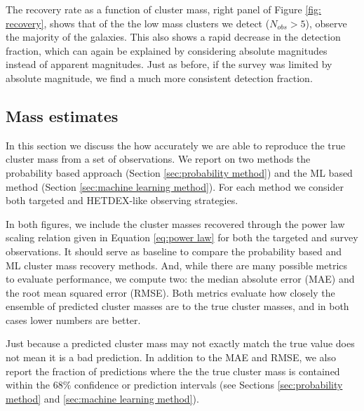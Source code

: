 \documentclass[fleqn,usenatbib]{mnras}
\begin{document}
The recovery rate as a function of cluster mass, right panel of Figure \ref{fig: recovery}, shows that of the the low mass clusters we detect ($N_{obs} >5$), observe the majority of the galaxies. This also shows a rapid decrease in the detection fraction, which can again be explained by considering absolute magnitudes instead of apparent magnitudes. Just as before, if the survey was limited by absolute magnitude, we find a much more consistent detection fraction.

\subsection{Mass estimates}
In this section we discuss the how accurately we are able to reproduce the true cluster mass from a set of observations. We report on two methods the probability based approach (Section \ref{sec:probability method}) and the ML based method (Section \ref{sec:machine learning method}). For each method we consider both targeted and HETDEX-like observing strategies.

In both figures, we include the cluster masses recovered through the power law scaling relation given in Equation \ref{eq:power law} for both the targeted and survey observations. It should serve as baseline to compare the probability based and ML cluster mass recovery methods. And, while there are many possible metrics to evaluate performance, we compute two: the median absolute error (MAE) and the root mean squared error (RMSE). Both metrics evaluate how closely the ensemble of predicted cluster masses are to the true cluster masses, and in both cases lower numbers are better.   

Just because a predicted cluster mass may not exactly match the true value does not mean it is a bad prediction. In addition to the MAE and RMSE, we also report the fraction of predictions where the the true cluster mass is contained within the 68\% confidence or prediction intervals (see Sections \ref{sec:probability method} and \ref{sec:machine learning method}). 
\end{document}
